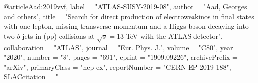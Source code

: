 @article{Aad:2019vvf,
      label          = "ATLAS-SUSY-2019-08",
      author         = "Aad, Georges and others",
      title          = "{Search for direct production of electroweakinos in final
                        states with one lepton, missing transverse momentum and a
                        Higgs boson decaying into two $b$-jets in (pp) collisions
                        at $\sqrt{s}=13$ TeV with the ATLAS detector}",
      collaboration  = "ATLAS",
      journal        = "Eur. Phys. J.",
      volume         = "C80",
      year           = "2020",
      number         = "8",
      pages          = "691",
      eprint         = "1909.09226",
      archivePrefix  = "arXiv",
      primaryClass   = "hep-ex",
      reportNumber   = "CERN-EP-2019-188",
      SLACcitation   = "%
}

